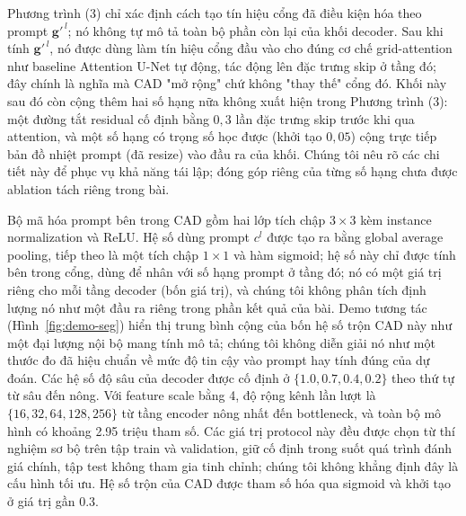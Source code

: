 \documentclass[11pt]{article}
\begin{document}
Phương trình (3) chỉ xác định cách tạo tín hiệu cổng đã điều kiện hóa theo prompt $\mathbf{g}'^{\,l}$; nó không tự mô tả toàn bộ phần còn lại của khối decoder. Sau khi tính $\mathbf{g}'^{\,l}$, nó được dùng làm tín hiệu cổng đầu vào cho đúng cơ chế grid-attention như baseline Attention U-Net tự động, tác động lên đặc trưng skip ở tầng đó; đây chính là nghĩa mà CAD "mở rộng" chứ không "thay thế" cổng đó. Khối này sau đó còn cộng thêm hai số hạng nữa không xuất hiện trong Phương trình (3): một đường tắt residual cố định bằng $0,3$ lần đặc trưng skip trước khi qua attention, và một số hạng có trọng số học được (khởi tạo $0,05$) cộng trực tiếp bản đồ nhiệt prompt (đã resize) vào đầu ra của khối. Chúng tôi nêu rõ các chi tiết này để phục vụ khả năng tái lập; đóng góp riêng của từng số hạng chưa được ablation tách riêng trong bài.

Bộ mã hóa prompt bên trong CAD gồm hai lớp tích chập $3\times3$ kèm instance normalization và ReLU. Hệ số dùng prompt $c^{l}$ được tạo ra bằng global average pooling, tiếp theo là một tích chập $1\times1$ và hàm sigmoid; hệ số này chỉ được tính bên trong cổng, dùng để nhân với số hạng prompt ở tầng đó; nó có một giá trị riêng cho mỗi tầng decoder (bốn giá trị), và chúng tôi không phân tích định lượng nó như một đầu ra riêng trong phần kết quả của bài. Demo tương tác (Hình~\ref{fig:demo-seg}) hiển thị trung bình cộng của bốn hệ số trộn CAD này như một đại lượng nội bộ mang tính mô tả; chúng tôi không diễn giải nó như một thước đo đã hiệu chuẩn về mức độ tin cậy vào prompt hay tính đúng của dự đoán. Các hệ số độ sâu của decoder được cố định ở $\{1.0,0.7,0.4,0.2\}$ theo thứ tự từ sâu đến nông. Với feature scale bằng 4, độ rộng kênh lần lượt là $\{16,32,64,128,256\}$ từ tầng encoder nông nhất đến bottleneck, và toàn bộ mô hình có khoảng 2.95 triệu tham số. Các giá trị protocol này đều được chọn từ thí nghiệm sơ bộ trên tập train và validation, giữ cố định trong suốt quá trình đánh giá chính, tập test không tham gia tinh chỉnh; chúng tôi không khẳng định đây là cấu hình tối ưu. Hệ số trộn của CAD được tham số hóa qua sigmoid và khởi tạo ở giá trị gần 0.3.
\end{document}
